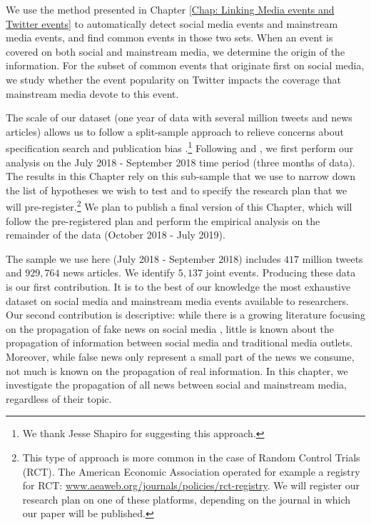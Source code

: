 We use the method presented in Chapter \ref{Chap: Linking Media events and Twitter events} to automatically detect social media events and mainstream media events, and find common events in those two sets. When an event is covered on both social and mainstream media, we determine the origin of the information. For the subset of common events that originate first on social media, we study whether the event popularity on Twitter impacts the coverage that mainstream media devote to this event.

The scale of our dataset (one year of data with several million tweets and news articles) allows us to follow a split-sample approach to relieve concerns about specification search and publication bias \citep{Leamer1978,Leamer1983,Glaeser2006_incentives}.\footnote{We thank Jesse Shapiro for suggesting this approach.} Following \citet{FafchampsLabonne2016,FafchampsLabonne2017} and \citet{AndersonMagruder2017}, we first perform our analysis on the July 2018 - September 2018 time period (three months of data). The results in this Chapter rely on this sub-sample that we use to narrow down the list of hypotheses we wish to test and to specify the research plan that we will pre-register.\footnote{This type of approach is more common in the case of Random Control Trials (RCT). The American Economic Association operated for example a registry for RCT: \url{www.aeaweb.org/journals/policies/rct-registry}. We will register our research plan on one of these platforms, depending on the journal in which our paper will be published.} We plan to publish a final version of this Chapter, which will follow the pre-registered plan and perform the empirical analysis on the remainder of the data (October 2018 - July 2019).

The sample we use here (July 2018 - September 2018) includes $417$ million tweets and $929,764$ news articles. We identify $5,137$ joint events. Producing these data is our first contribution. It is to the best of our knowledge the most exhaustive dataset on social media and mainstream media events available to researchers. Our second contribution is descriptive: while there is a growing literature focusing on the propagation of fake news on social media \citep{Vosoughietal2017,VosoughiRoyAral2018}, little is known about the propagation of information between social media and traditional media outlets. Moreover, while false news only represent a small part of the news we consume, not much is known on the propagation of real information. In this chapter, we investigate the propagation of all news between social and mainstream media, regardless of their topic.


